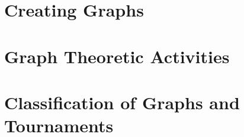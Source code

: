 
\section{Creating Graphs}
\label{sec:graphtheory}






\bigskip


\clearpage


\section{Graph Theoretic Activities}
\label{sec:graph:theoretic:acivities}






\bigskip


\clearpage

\section{Classification of Graphs and Tournaments}
\label{sec:graphtheory:classification}






\bigskip


\clearpage


